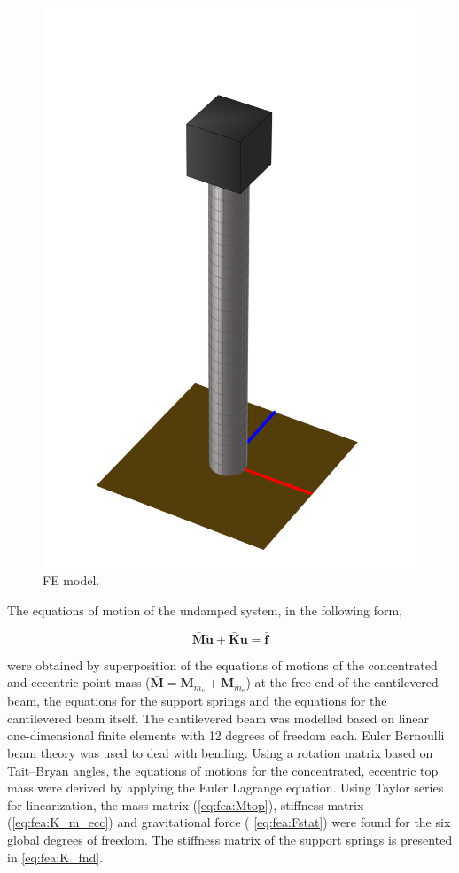 \documentclass{article}
\begin{document}
\begin{figure}[ht]
    \centering
    \includegraphics[width=0.5\linewidth]{figures/FEModel.png}
    \caption{FE model.}
    \label{fig:fea:model}
\end{figure}

The equations of motion of the undamped system, in the following form,

\begin{equation}
    \mathbf{\bar{M}}\ddot{\mathbf{u}}+\mathbf{\bar{K}}\mathbf{u} = \mathbf{\bar{f}}
    \label{eq:fea:system}
\end{equation}

were obtained by superposition of the equations of motions of the concentrated and eccentric point mass ($ \mathbf{\bar{M}} = \mathbf{M}_{m_c} + \mathbf{M}_{m_e}$) at the free end of the cantilevered beam, the equations for the support springs and the equations for the cantilevered beam itself. The cantilevered beam was modelled based on linear one-dimensional finite elements with 12 degrees of freedom each. Euler Bernoulli beam theory was used to deal with bending. Using a rotation matrix based on Tait–Bryan angles, the equations of motions for the concentrated, eccentric top mass were derived by applying the Euler Lagrange equation. Using Taylor series for linearization, the mass matrix (\autoref{eq:fea:Mtop}), stiffness matrix (\autoref{eq:fea:K_m_ecc}) and gravitational force ( \autoref{eq:fea:Fstat}) were found for the six global degrees of freedom. The stiffness matrix of the support springs is presented in \autoref{eq:fea:K_fnd}. 
\end{document}
